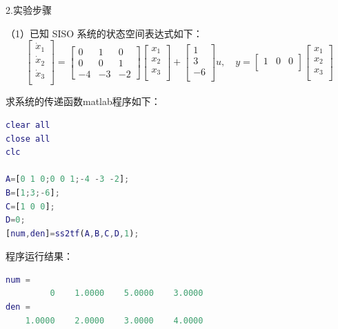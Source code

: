 \documentclass[UTF8]{ctexart}
\begin{document}
\par 2.实验步骤
\par（1）已知 SISO 系统的状态空间表达式如下：
\begin{equation}
    \begin{bmatrix}
    \dot x_1\\
    \dot x_2\\
    \dot x_3\\
    \end{bmatrix}=\begin{bmatrix}
    0 & 1 & 0\\
    0 & 0 & 1\\
    -4 & -3 & -2\end{bmatrix}\begin{bmatrix}
    x_1\\
    x_2\\
    x_3\\
    \end{bmatrix}+\begin{bmatrix}
    1\\
    3\\
    -6\\
    \end{bmatrix}u  , \quad   y=\begin{bmatrix}
    1 & 0 & 0 \\
    \end{bmatrix}\begin{bmatrix}
    x_1\\
    x_2\\
    x_3\\
    \end{bmatrix}
\end{equation}

\par 求系统的传递函数matlab程序如下：
\par  \begin{lstlisting}[language=matlab,escapeinside=``]
clear all
close all
clc

A=[0 1 0;0 0 1;-4 -3 -2];
B=[1;3;-6];
C=[1 0 0];
D=0;
[num,den]=ss2tf(A,B,C,D,1);
\end{lstlisting}

\par 程序运行结果：
\par  \begin{lstlisting}[language=matlab,escapeinside=``]
num =
         0    1.0000    5.0000    3.0000
den =
    1.0000    2.0000    3.0000    4.0000
\end{lstlisting}
\end{document}
